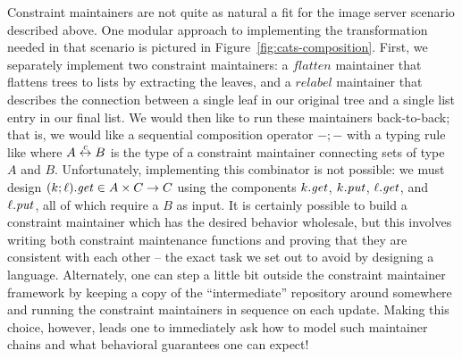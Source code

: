 Constraint maintainers are not quite as natural a fit for the image server
scenario described above. One modular approach to implementing the
transformation needed in that scenario is pictured in
Figure~\ref{fig:cats-composition}. First, we separately implement two
constraint maintainers: a $\mathit{flatten}$ maintainer that flattens trees
to lists by extracting the leaves, and a $\mathit{relabel}$ maintainer that
describes the connection between a single leaf in our original tree and a
single list entry in our final list. We would then like to run these
maintainers back-to-back; that is, we would like a sequential composition
operator $-;-$ with a typing rule like
where $A \overset{c}{\leftrightarrow} B$ is the type of a constraint maintainer connecting sets
of type $A$ and $B$. Unfortunately, implementing this combinator is not
possible: we must design $(k;\ell).\mathit{get} \in A \times C \to C$ using the
components $k.\mathit{get}$, $k.\mathit{put}$, $\ell.\mathit{get}$, and $\ell.\mathit{put}$, all of
which require a $B$ as input. It is certainly possible to build a constraint
maintainer which has the desired behavior wholesale, but this involves
writing both constraint maintenance functions and proving that they are
consistent with each other -- the exact task we set out to avoid by
designing a language. Alternately, one can step a little bit outside the
constraint maintainer framework by keeping a copy of the ``intermediate''
repository around somewhere and running the constraint maintainers in
sequence on each update. Making this choice, however, leads one to
immediately ask how to model such maintainer chains and what behavioral
guarantees one can expect!


